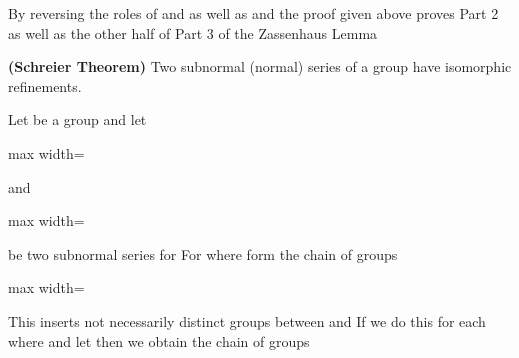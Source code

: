 \documentclass[11pt,oneside]{article}
\begin{document}
\BookNarrativetrue

\begin{BookBody}

By reversing the roles of  and as well as  and  the proof given above proves Part 2 as well as the other half of Part 3 of the Zassenhaus Lemma\BookEnd{\blacklozenge}

 \textbf{(Schreier Theorem)} Two subnormal (normal) series of a group  have isomorphic refinements.

 Let  be a group and let

\begin{center}\begin{adjustbox}{max width=\linewidth}\end{adjustbox}\end{center}

\noindent and

\begin{center}\begin{adjustbox}{max width=\linewidth}\end{adjustbox}\end{center}

\noindent be two subnormal series for  For  where  form the chain of groups

\begin{center}\begin{adjustbox}{max width=\linewidth}\end{adjustbox}\end{center}

\noindent This inserts  not necessarily distinct groups between  and  If we do this for each  where  and let  then we obtain the chain of groups


\end{BookBody}
\end{document}
